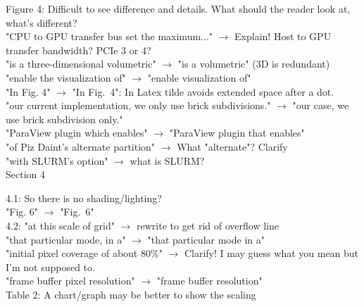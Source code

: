 \documentclass[]{article}
\begin{document}
Figure 4: Difficult to see difference and details. What should the reader look at, what's different?\\

"CPU to GPU transfer bus set the maximum..." $\rightarrow$ Explain! Host to GPU transfer bandwidth? PCIe 3 or 4?\\

"is a three-dimensional volumetric" $\rightarrow$ "is a volumetric" (3D is redundant)\\

"enable the visualization of" $\rightarrow$ "enable visualization of"\\

"In Fig.   4" $\rightarrow$ "In Fig.~4": In Latex tilde avoids extended space after a dot.\\

"our current implementation, we only use brick subdivisions." $\rightarrow$ "our case, we use brick subdivision only."\\

"ParaView plugin which enables" $\rightarrow$ "ParaView plugin that enables"\\

"of Piz Daint's alternate partition" $\rightarrow$ What "alternate"? Clarify\\

"with SLURM's option" $\rightarrow$ what is SLURM?\\


Section 4

4.1: So there is no shading/lighting?\\

"Fig.  6" $\rightarrow$ "Fig.~6"\\

4.2: "at this scale of grid" $\rightarrow$ rewrite to get rid of overflow line\\

"that particular mode, in a" $\rightarrow$ "that particular mode in a"\\

"initial pixel coverage of about 80$\%$" $\rightarrow$ Clarify! I may guess what you mean but I'm not supposed to.\\

"frame buffer pixel resolution" $\rightarrow$ "frame buffer resolution"\\

Table 2: A chart/graph may be better to show the scaling\\
\end{document}
